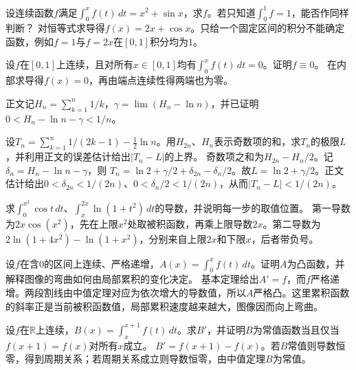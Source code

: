 \setlength{\parskip}{3.5pt}
设连续函数\(f\)满足\(\int_0^x f(t)\,dt=x^2+\sin x\)，求\(f\)。若只知道\(\int_0^1 f=1\)，能否作同样判断？
\solutionanswer
对恒等式求导得\(f(x)=2x+\cos x\)。只给一个固定区间的积分不能确定函数，例如\(f=1\)与\(f=2x\)在\([0,1]\)积分均为\(1\)。


\setlength{\parskip}{3.5pt}
设\(f\)在\([0,1]\)上连续，且对所有\(x\in[0,1]\)均有\(\int_0^x f(t)\,dt=0\)。证明\(f\equiv0\)。
\solutionanswer
在内部求导得\(f(x)=0\)，再由端点连续性得两端也为零。


正文记\(H_n=\sum_{k=1}^n1/k\)，\(\gamma=\lim(H_n-\ln n)\)，并已证明\(0<H_n-\ln n-\gamma<1/n\)。

\setlength{\parskip}{3.5pt}
设\(T_n=\sum_{k=1}^n1/(2k-1)-\tfrac12\ln n\)。用\(H_{2n}\)、\(H_n\)表示奇数项的和，求\(T_n\)的极限\(L\)，并利用正文的误差估计给出\(|T_n-L|\)的上界。
\solutionanswer
奇数项之和为\(H_{2n}-H_n/2\)。记\(\delta_n=H_n-\ln n-\gamma\)，则
\(T_n=\ln2+\gamma/2+\delta_{2n}-\delta_n/2\)。故\(L=\ln2+\gamma/2\)。正文估计给出\(0<\delta_{2n}<1/(2n)\)、\(0<\delta_n/2<1/(2n)\)，从而\(|T_n-L|<1/(2n)\)。


\setlength{\parskip}{3.5pt}
求\(\int_0^{x^2}\cos t\,dt\)、\(\int_x^{2x}\ln(1+t^2)\,dt\)的导数，并说明每一步的取值位置。
\solutionanswer
第一导数为\(2x\cos(x^2)\)，先在上限\(x^2\)处取被积函数，再乘上限导数\(2x\)。第二导数为\(2\ln(1+4x^2)-\ln(1+x^2)\)，分别来自上限\(2x\)和下限\(x\)，后者带负号。


\setlength{\parskip}{3.5pt}
设\(f\)在含\(0\)的区间上连续、严格递增，\(A(x)=\int_0^x f(t)\,dt\)。证明\(A\)为凸函数，并解释图像的弯曲如何由局部累积的变化决定。
\solutionanswer
基本定理给出\(A'=f\)，而\(f\)严格递增。两段割线由中值定理对应为依次增大的导数值，所以\(A\)严格凸。这里累积函数的斜率正是当前被积函数值，局部累积速度越来越大，图像因而向上弯曲。


\setlength{\parskip}{3.5pt}
设\(f\)在\(\mathbb R\)上连续，\(B(x)=\int_x^{x+1}f(t)\,dt\)。求\(B'\)，并证明\(B\)为常值函数当且仅当\(f(x+1)=f(x)\)对所有\(x\)成立。
\solutionanswer
\(B'=f(x+1)-f(x)\)。若\(B\)常值则导数恒零，得到周期关系；若周期关系成立则导数恒零，由中值定理\(B\)为常值。


